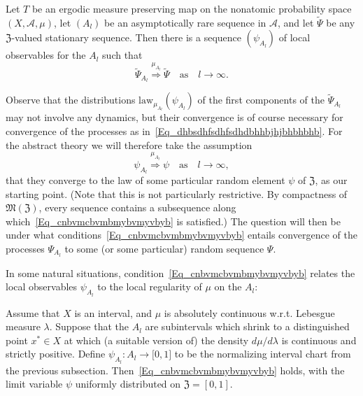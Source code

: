 \documentclass[AHL,Unicode,longabstracts]{cedram}
\newcommand{\clA}{\mathcal{A}}
\newcommand{\law}{\mathrm{law}}
\newcommand{\frkZ}{\mathfrak{Z}}
\newcommand{\frkM}{\mathfrak{M}}
\begin{document}
\begin{theo}\label{T_PrescribingPSI}
Let $T$ be an ergodic measure preserving map on the nonatomic probability space $(X,\clA,\mu)$, let $(A_{l})$ be an asymptotically rare sequence in $\clA$, and let $\widetilde{\Psi}$ be any $\frkZ$-valued stationary sequence. Then there is a sequence $(\psi_{A_{l}})$ of local observables for the $A_{l}$ such that
\begin{equation}\label{Eq_dhbsdhfsdhfsdhdbhhbjhjbhbhbhb}
\widetilde{\Psi}_{A_{l}}\overset{\mu_{A_{l}}}{\Longrightarrow}\widetilde{\Psi }\quad\text{as}\quad l\rightarrow\infty.
\end{equation}
\end{theo}



Observe that the distributions $\law_{\mu_{A_{l}}}(\psi_{A_{l}})$ of the first components of the $\widetilde{\Psi}_{A_{l}}$ may not involve any dynamics, but their convergence is of course necessary for convergence of the processes as in~\eqref{Eq_dhbsdhfsdhfsdhdbhhbjhjbhbhbhb}. For the abstract theory we will therefore take the assumption
\begin{equation}\label{Eq_cnbvmcbvmbmybvmyvbyb}
\psi_{A_{l}}\overset{\mu_{A_{l}}}{\Longrightarrow}\psi\quad\text{as}\quad l\rightarrow\infty, 
\end{equation}
that they converge to the law of some particular random element $\psi$ of $\frkZ$, as our starting point. (Note that this is not particularly restrictive. By compactness of $\frkM(\frkZ)$, every sequence contains a subsequence along which~\eqref{Eq_cnbvmcbvmbmybvmyvbyb} is satisfied.) The question will then be under what conditions~\eqref{Eq_cnbvmcbvmbmybvmyvbyb} entails convergence of the processes $\Psi_{A_{l}}$ to some (or some particular) random sequence $\Psi$.

In some natural situations, condition~\eqref{Eq_cnbvmcbvmbmybvmyvbyb} relates the local observables $\psi_{A_{l}}$ to the local regularity of $\mu$ on the $A_{l}$:

\begin{exam}
Assume that $X$ is an interval, and $\mu$ is absolutely continuous w.r.t. Lebesgue measure $\lambda$. Suppose that the $A_{l}$ are subintervals which shrink to a distinguished point $x^{\ast }\in X$ at which (a suitable version of) the density $d\mu/d\lambda$ is continuous and strictly positive. Define $\psi_{A_{l}}:A_{l}\rightarrow
\lbrack0,1]$ to be the normalizing interval chart from the previous subsection. Then~\eqref{Eq_cnbvmcbvmbmybvmyvbyb} holds, with the limit variable $\psi$ uniformly distributed on $\frkZ=[0,1]$.
\end{exam}
\end{document}
